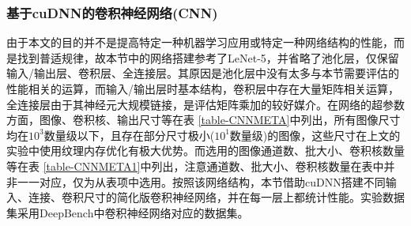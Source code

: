 \subsubsection{基于cuDNN的卷积神经网络(CNN)}
\par 由于本文的目的并不是提高特定一种机器学习应用或特定一种网络结构的性能，而是找到普适规律，故本节中的网络搭建参考了LeNet-5，并省略了池化层，仅保留输入/输出层、卷积层、全连接层。其原因是池化层中没有太多与本节需要评估的性能相关的运算，而输入/输出层时基本结构，卷积层中存在大量矩阵相关运算，全连接层由于其神经元大规模链接，是评估矩阵乘加的较好媒介。在网络的超参数方面，图像、卷积核、输出尺寸等在表 \ref{table-CNNMETA}中列出，所有图像尺寸均在$ 10^3 $数量级以下，且存在部分尺寸极小($ 10^1 $数量级)的图像，这些尺寸在上文的实验中使用纹理内存优化有极大优势。而选用的图像通道数、批大小、卷积核数量等在表 \ref{table-CNNMETA1}中列出，注意通道数、批大小、卷积核数量在表中并非一一对应，仅为从表项中选用。按照该网络结构，本节借助cuDNN搭建不同输入、连接、卷积尺寸的简化版卷积神经网络，并在每一层上都统计性能。实验数据集采用DeepBench中卷积神经网络对应的数据集。
